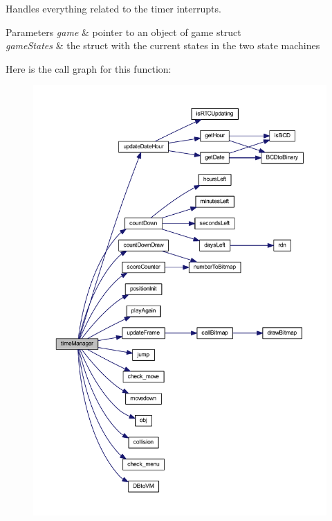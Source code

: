 Handles everything related to the timer interrupts. 


\begin{DoxyParams}{Parameters}
{\em game} & pointer to an object of game struct \\
\hline
{\em game\+States} & the struct with the current states in the two state machines \\
\hline
\end{DoxyParams}
Here is the call graph for this function\+:
\nopagebreak
\begin{figure}[H]
\begin{center}
\leavevmode
\includegraphics[width=350pt]{group___x_mas_run_gaa7d8686bcb6a92421aeba74757c6cabb_cgraph}
\end{center}
\end{figure}
